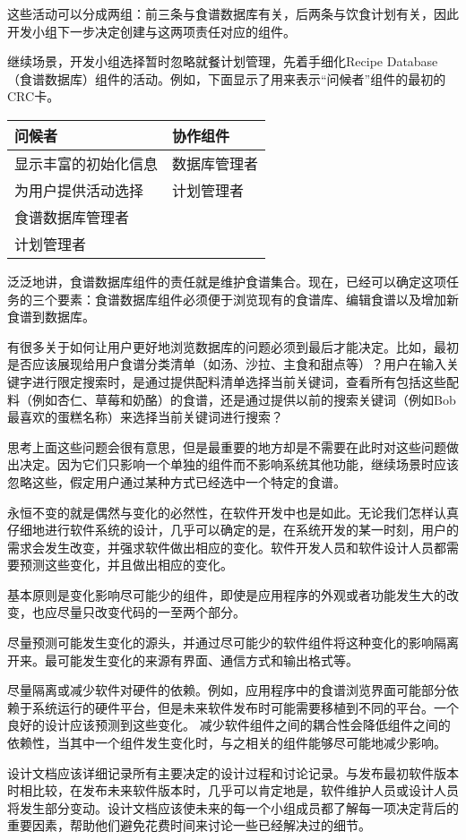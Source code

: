 这些活动可以分成两组：前三条与食谱数据库有关，后两条与饮食计划有关，因此开发小组下一步决定创建与这两项责任对应的组件。

继续场景，开发小组选择暂时忽略就餐计划管理，先着手细化Recipe Database（食谱数据库）组件的活动。例如，下面显示了用来表示“问候者”组件的最初的CRC卡。

\begin{table}[htbp]
\centering
\begin{tabular}{|l|l|}
\hline
问候者			&协作组件\\
\hline
显示丰富的初始化信息&	数据库管理者\\
\hline
为用户提供活动选择&	计划管理者\\
\hline
食谱数据库管理者 & \\
\hline
计划管理者 & \\
\hline
\end{tabular}
\end{table}



泛泛地讲，食谱数据库组件的责任就是维护食谱集合。现在，已经可以确定这项任务的三个要素：食谱数据库组件必须便于浏览现有的食谱库、编辑食谱以及增加新食谱到数据库。


有很多关于如何让用户更好地浏览数据库的问题必须到最后才能决定。比如，最初是否应该展现给用户食谱分类清单（如汤、沙拉、主食和甜点等）？用户在输入关键字进行限定搜索时，是通过提供配料清单选择当前关键词，查看所有包括这些配料（例如杏仁、草莓和奶酪）的食谱，还是通过提供以前的搜索关键词（例如Bob最喜欢的蛋糕名称）来选择当前关键词进行搜索？

思考上面这些问题会很有意思，但是最重要的地方却是不需要在此时对这些问题做出决定。因为它们只影响一个单独的组件而不影响系统其他功能，继续场景时应该忽略这些，假定用户通过某种方式已经选中一个特定的食谱。


永恒不变的就是偶然与变化的必然性，在软件开发中也是如此。无论我们怎样认真仔细地进行软件系统的设计，几乎可以确定的是，在系统开发的某一时刻，用户的需求会发生改变，并强求软件做出相应的变化。软件开发人员和软件设计人员都需要预测这些变化，并且做出相应的变化。


\begin{compactitem}
\item 基本原则是变化影响尽可能少的组件，即使是应用程序的外观或者功能发生大的改变，也应尽量只改变代码的一至两个部分。
\item 尽量预测可能发生变化的源头，并通过尽可能少的软件组件将这种变化的影响隔离开来。最可能发生变化的来源有界面、通信方式和输出格式等。
\item 尽量隔离或减少软件对硬件的依赖。例如，应用程序中的食谱浏览界面可能部分依赖于系统运行的硬件平台，但是未来软件发布时可能需要移植到不同的平台。一个良好的设计应该预测到这些变化。
减少软件组件之间的耦合性会降低组件之间的依赖性，当其中一个组件发生变化时，与之相关的组件能够尽可能地减少影响。
\item 设计文档应该详细记录所有主要决定的设计过程和讨论记录。与发布最初软件版本时相比较，在发布未来软件版本时，几乎可以肯定地是，软件维护人员或设计人员将发生部分变动。设计文档应该使未来的每一个小组成员都了解每一项决定背后的重要因素，帮助他们避免花费时间来讨论一些已经解决过的细节。
\end{compactitem}

